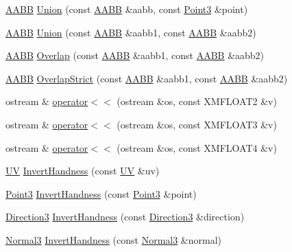 \begin{DoxyCompactItemize}
\item 
\hyperlink{structmage_1_1_a_a_b_b}{A\+A\+BB} \hyperlink{namespacemage_ae9ff69102d392718bf8636b90c825a8d}{Union} (const \hyperlink{structmage_1_1_a_a_b_b}{A\+A\+BB} \&aabb, const \hyperlink{structmage_1_1_point3}{Point3} \&point)
\item 
\hyperlink{structmage_1_1_a_a_b_b}{A\+A\+BB} \hyperlink{namespacemage_ab9b3a22c6c2fc5537f00bf4f7516746f}{Union} (const \hyperlink{structmage_1_1_a_a_b_b}{A\+A\+BB} \&aabb1, const \hyperlink{structmage_1_1_a_a_b_b}{A\+A\+BB} \&aabb2)
\item 
\hyperlink{structmage_1_1_a_a_b_b}{A\+A\+BB} \hyperlink{namespacemage_a1068090c66ff1c6398b134455730eb02}{Overlap} (const \hyperlink{structmage_1_1_a_a_b_b}{A\+A\+BB} \&aabb1, const \hyperlink{structmage_1_1_a_a_b_b}{A\+A\+BB} \&aabb2)
\item 
\hyperlink{structmage_1_1_a_a_b_b}{A\+A\+BB} \hyperlink{namespacemage_a47de3c8ef21f996ee234f83bb51b12e5}{Overlap\+Strict} (const \hyperlink{structmage_1_1_a_a_b_b}{A\+A\+BB} \&aabb1, const \hyperlink{structmage_1_1_a_a_b_b}{A\+A\+BB} \&aabb2)
\item 
ostream \& \hyperlink{namespacemage_ac348ad49bf7e9912aa70cda1b0ca553d}{operator$<$$<$} (ostream \&os, const X\+M\+F\+L\+O\+A\+T2 \&v)
\item 
ostream \& \hyperlink{namespacemage_a44b2d3046802608544402245919f219b}{operator$<$$<$} (ostream \&os, const X\+M\+F\+L\+O\+A\+T3 \&v)
\item 
ostream \& \hyperlink{namespacemage_af6c1d1c5718d611450932bde30d2bfef}{operator$<$$<$} (ostream \&os, const X\+M\+F\+L\+O\+A\+T4 \&v)
\item 
\hyperlink{structmage_1_1_u_v}{UV} \hyperlink{namespacemage_a13b912f3dcd9c202fe3f9edb424e3b78}{Invert\+Handness} (const \hyperlink{structmage_1_1_u_v}{UV} \&uv)
\item 
\hyperlink{structmage_1_1_point3}{Point3} \hyperlink{namespacemage_a20ded71f51e2014bab8e7d232eaf1c29}{Invert\+Handness} (const \hyperlink{structmage_1_1_point3}{Point3} \&point)
\item 
\hyperlink{structmage_1_1_direction3}{Direction3} \hyperlink{namespacemage_a1d236e395736f7b5e28e52ccd3d643ae}{Invert\+Handness} (const \hyperlink{structmage_1_1_direction3}{Direction3} \&direction)
\item 
\hyperlink{structmage_1_1_normal3}{Normal3} \hyperlink{namespacemage_a437458a2e3278f106da66534c5218e4e}{Invert\+Handness} (const \hyperlink{structmage_1_1_normal3}{Normal3} \&normal)
\item 

\end{DoxyCompactItemize}
